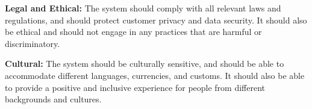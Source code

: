 
    \item \textbf{Legal and Ethical:} The system should comply with all relevant laws and regulations, and should protect customer privacy and data security. It should also be ethical and should not engage in any practices that are harmful or discriminatory.
    \item \textbf{Cultural:} The system should be culturally sensitive, and should be able to accommodate different languages, currencies, and customs. It should also be able to provide a positive and inclusive experience for people from different backgrounds and cultures.